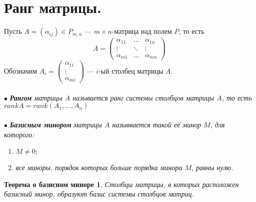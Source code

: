 \section{Ранг матрицы.}
Пусть  $A=(\alpha_{ij}) \in P_{m,n}$ --- $m\times n$-матрица над полем $P$, то есть
$$A= \begin{pmatrix} 
	\alpha_{11} & \dots & \alpha_{1n} 
	\\ \vdots & \ddots & \vdots
	\\ \alpha_{m1} & \dots & \alpha_{mn}
\end{pmatrix}$$ Обозначим $A_{i}=\begin{pmatrix} 
	\alpha_{1i}
	\\\vdots
	\\\alpha_{mi}
\end{pmatrix}$ --- $i$-ый столбец матрицы $A$.\\\\
$\bullet$ \textit{\textbf{Рангом} матрицы $A$ называется ранг системы столбцов матрицы $A$, то есть $rankA = rank(A_1,\dots,A_n)$}\\\\
$\bullet$ \textit{\textbf{Базисным минором} матрицы $A$ назыввается такой её минор $M$, для которого:}\begin{enumerate}
	\item $M\ne 0;$
	\item \textit{все миноры, порядок которых больше порядка минора $M$, равны нулю.}
\end{enumerate}
\newtheorem*{th7_1}{Теорема о базисном миноре}\begin{th7_1} Столбцы матрицы, в которых расположен базисный минор, образуют базис системы столбцов матриц. \end{th7_1}

